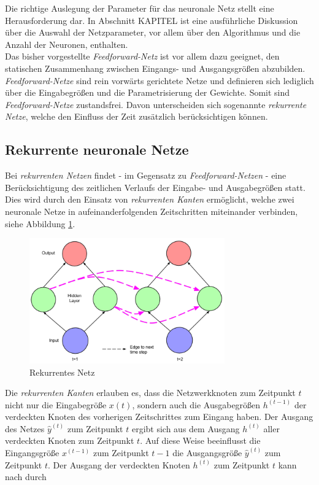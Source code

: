Die richtige Auslegung der Parameter für das neuronale Netz stellt eine Herausforderung dar. In Abschnitt KAPITEL ist eine ausführliche Diskussion über die Auswahl der Netzparameter, vor allem über den Algorithmus und  die Anzahl der Neuronen, enthalten. \\ 
Das bisher vorgestellte \textit{Feedforward-Netz} ist vor allem dazu geeignet, den statischen Zusammenhang zwischen Eingangs- und Ausgangsgrößen abzubilden. \textit{Feedforward-Netze} sind rein vorwärts gerichtete Netze und definieren sich lediglich über die Eingabegrößen und die Parametrisierung der Gewichte. Somit sind \textit{Feedforward-Netze} zustandsfrei. Davon unterscheiden sich sogenannte \textit{rekurrente Netze}, welche den Einfluss der Zeit zusätzlich berücksichtigen können. 

\subsection{Rekurrente neuronale Netze}

Bei \textit{rekurrenten Netzen} findet - im Gegensatz zu \textit{Feedforward-Netzen} - eine Berücksichtigung des zeitlichen Verlaufs der Eingabe- und Ausgabegrößen statt. Dies wird durch den Einsatz von \textit{rekurrenten Kanten} ermöglicht, welche zwei neuronale Netze in aufeinanderfolgenden Zeitschritten miteinander verbinden, siehe Abbildung \ref{fig:recurrent}.  

\begin{figure} [h]
	\centering
	\includegraphics[width=0.75\textwidth]{images/recurrent_net}
	\caption{Rekurrentes Netz \cite{Lipton.5292015}}
	\label{fig:recurrent}
\end{figure}

Die \textit{rekurrenten Kanten} erlauben es, dass die Netzwerkknoten zum Zeitpunkt $t$ nicht nur die Eingabegröße $x(t)$, sondern auch die Ausgabegrößen $h^{(t-1)}$ der verdeckten Knoten des vorherigen Zeitschrittes zum Eingang haben. Der Ausgang des Netzes $\hat{y}^{(t)}$ zum Zeitpunkt $t$ ergibt sich aus dem Ausgang $h^{(t)}$ aller verdeckten Knoten zum Zeitpunkt $t$. Auf diese Weise beeinflusst die Eingangsgröße $x^{(t-1)}$ zum Zeitpunkt $t-1$ die Ausgangsgröße $\hat{y}^{(t)}$ zum Zeitpunkt $t$. Der Ausgang der verdeckten Knoten $h^{(t)}$ zum Zeitpunkt $t$ kann nach \cite{Lipton.5292015} durch 

